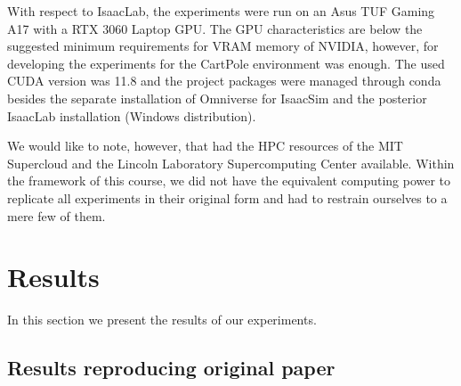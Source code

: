\documentclass[10pt]{article} %
\begin{document}

With respect to IsaacLab, the experiments were run on an Asus TUF Gaming A17 with a RTX 3060 Laptop GPU. The GPU characteristics are below 
the suggested minimum requirements for VRAM memory of NVIDIA, however, for developing the experiments for the CartPole environment was enough.
The used CUDA version was 11.8 and the project packages were managed through conda besides the separate installation of Omniverse for IsaacSim and 
the posterior IsaacLab installation (Windows distribution). 

\noindent We would like to note, however, that \cite{rle-paper} had the HPC resources of the MIT Supercloud and the Lincoln Laboratory Supercomputing Center available. Within the framework of this course, we did not have the equivalent computing power to replicate all experiments in their original form and had to restrain ourselves to a mere few of them.

\hypertarget{sec4}{\section{Results}}

In this section we present the results of our experiments.



\subsection{Results reproducing original paper}
\end{document}
